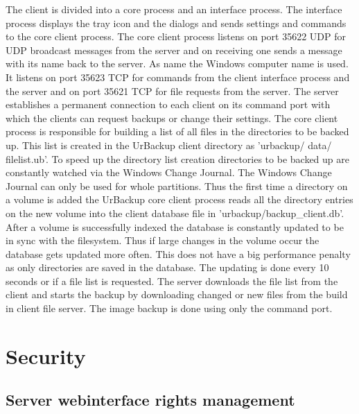 \documentclass[a4paper,10pt]{article}
\begin{document}
The client is divided into a core process and an interface process. The interface process displays the tray icon and the dialogs and sends settings and commands to the core client process. The core client process listens on port 35622 UDP for UDP broadcast messages from the server and on receiving one sends a message with its name back to the server. As name the Windows computer name is used. It listens on port 35623 TCP for commands from the client interface process and the server and on port 35621 TCP for file requests from the server. The server establishes a permanent connection to each client on its command port with which the clients can request backups or change their settings. The core client process is responsible for building a list of all files in the directories to be backed up. This list is created in the UrBackup client directory as 'urbackup/ data/ filelist.ub'. To speed up the directory list creation directories to be backed up are constantly watched via the Windows Change Journal. The Windows Change Journal can only be used for whole partitions. Thus the first time a directory on a volume is added the UrBackup core client process reads all the directory entries on the new volume into the client database file in 'urbackup/backup\_client.db'. After a volume is successfully indexed the database is constantly updated to be in sync with the filesystem. Thus if large changes in the volume occur the database gets updated more often. This does not have a big performance penalty as only directories are saved in the database. The updating is done every 10 seconds or if a file list is requested. The server downloads the file list from the client and starts the backup by downloading changed or new files from the build in client file server. The image backup is done using only the command port. 

\section{Security}
\label{sec_security}

\subsection{Server webinterface rights management}
\end{document}
